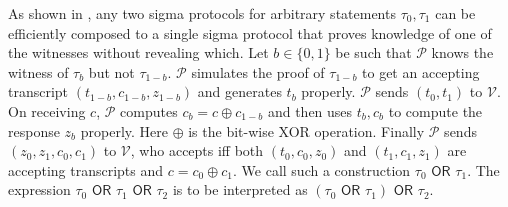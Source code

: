 \documentclass[runningheads]{llncs}
\begin{document}
As shown in \cite{CDS94}, any two sigma protocols for arbitrary statements $\tau_0, \tau_1$ can be efficiently composed to a single sigma protocol that proves knowledge of one of the witnesses without revealing which. Let $b \in \{0, 1\}$ be such that $\mathcal{P}$ knows the witness of $\tau_{b}$ but not $\tau_{1-b}$.
$\mathcal{P}$ simulates the proof of $\tau_{1-b}$ to get an accepting transcript $(t_{1-b}, c_{1-b}, z_{1-b})$ and generates $t_b$ properly. $\mathcal{P}$ sends $(t_0, t_1)$ to $\mathcal{V}$. On receiving $c$, $\mathcal{P}$ computes $c_b = c \oplus c_{1-b}$ and then uses $t_b, c_b$ to compute the response $z_b$ properly. Here $\oplus$ is the bit-wise XOR operation. Finally $\mathcal{P}$ sends $(z_0, z_1, c_0, c_1)$ to $\mathcal{V}$, who accepts iff both $(t_0, c_0, z_0)$ and $(t_1, c_1, z_1)$ are accepting transcripts and $c = c_0 \oplus c_1$.
We call such a construction $\tau_0 \textsf{ OR } \tau_1$. The expression $\tau_0\textsf{ OR }\tau_1\textsf{ OR }\tau_2$ is to be interpreted as $(\tau_0\textsf{ OR }\tau_1)\textsf{ OR }\tau_2$.
\end{document}
